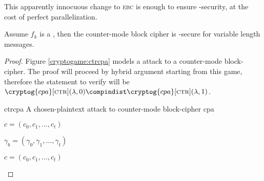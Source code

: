 This apparently innocuous change to \textsc{ebc} is enough to ensure \cpa-security, at the cost of perfect parallelization.

\begin{theorem}
    Assume $f_k$ is a \prf, then the counter-mode block cipher is \cpa-secure for variable length messages\footnotemark.
\end{theorem}

\begin{proof}
    Figure \ref{cryptogame:ctrcpa} models a \cpa{} attack to a counter-mode block-cipher. The proof will proceed by hybrid argument starting from this game, therefore the statement to verify will be $\cryptog{cpa}[\textsc{ctr}](\lambda, 0) \compindist \cryptog{cpa}[\textsc{ctr}](\lambda, 1)$.

    \begin{cryptogame}
        {ctrcpa}
        {A chosen-plaintext attack to counter-mode block-cipher}
        {cpa}
        
        \cseqbeginloop

        {$c = (c_0, c_1, \dots, c_t)$}{}

        \cseqendloop

        \cseqdelay
        
        {$\gamma_b = (\gamma_0, \gamma_1, \dots, \gamma_t)$}{}

        \cseqdelay
        
        \cseqbeginloop

        {$c = (c_0, c_1, \dots, c_t)$}{}


\end{cryptogame}
\end{proof}
